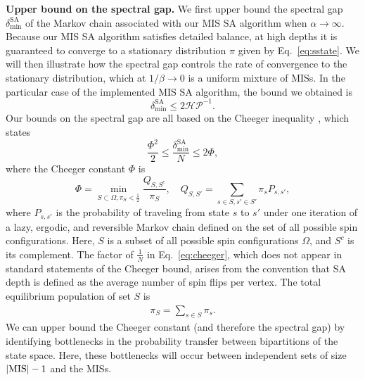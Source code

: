 \documentclass[twocolumn,amssymb,secnumarabic, prl, aps, nofootinbib]{revtex4-1}
\begin{document}
\noindent\textbf{Upper bound on the spectral gap. }
\label{subsubsec:mixing_time}
We first upper bound the spectral gap $\delta_{\min}^{\text{SA}}$ of the Markov chain associated with our MIS SA algorithm when $\alpha\rightarrow\infty$. Because our MIS SA algorithm satisfies detailed balance, at high depths it is guaranteed to converge to a stationary distribution $\pi$ given by Eq.~\eqref{eq:sstate}.
We will then illustrate how the spectral gap controls the rate of convergence to the stationary distribution, which at $1/\beta\rightarrow 0$ is a uniform mixture of MISs. %
In the particular case of the implemented MIS SA algorithm, the bound we obtained is 
\begin{equation}
	\boxed{\delta_{\min}^{\text{SA}}\leq 2\mathcal{HP}^{-1}}.\label{eq:MIS_SA_bound}
\end{equation}
Our bounds on the spectral gap are all based on the Cheeger inequality \cite{cheeger_ref_diaconis}, which states
\begin{equation}
	\frac{\Phi^2}{2} \le \frac{\delta_{\min}^{\text{SA}}}{N}\leq 2\Phi,\label{eq:cheeger}
\end{equation}
where the Cheeger constant $\Phi$ is
\begin{equation}
	\Phi=\min_{S\subset\Omega,\pi_S<\frac{1}{2}}\frac{Q_{S,S^c}}{\pi_S},\quad Q_{S,S'}=\sum_{s\in S, s'\in S'}\pi_s P_{s, s'},
\end{equation}
where $P_{s, s'}$ is the probability of traveling from state $s$ to $s'$ under one iteration of a lazy, ergodic, and reversible Markov chain defined on the set of all possible spin configurations. Here, $S$ is a subset of all possible spin configurations $\Omega$, and $S^c$ is its complement. The factor of $\frac{1}{N}$ in Eq.~\eqref{eq:cheeger}, which does not appear in standard statements of the Cheeger bound, arises from the convention that SA depth is defined as the average number of spin flips per vertex. The total equilibrium population of set $S$ is 
\begin{align}
	\pi_S = \sum_{s\in S}\pi_s.
\end{align}
We can upper bound the Cheeger constant (and therefore the spectral gap) by identifying bottlenecks in the probability transfer between bipartitions of the state space. Here, these bottlenecks will occur between independent sets of size $\rm{|{MIS}|}-1$ and the MISs. \\
\end{document}
